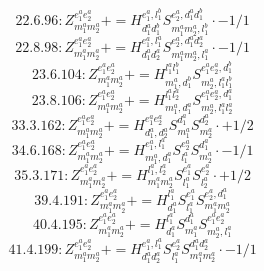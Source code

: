 \documentclass[letterpaper,10pt,fleqn,leqno,onecolumn]{article}
\begin{document}
\begin{equation} \;\;\;\;\;\;  22.6.96: Z^{e_{1}^{a}e_{2}^{a}}_{m_{1}^{a}m_{2}^{a}}+=H^{e_{1}^{a},l_{1}^{b}}_{d_{1}^{a}d_{1}^{b}}S^{e_{2}^{a},d_{1}^{a}d_{1}^{b}}_{m_{1}^{a}m_{2}^{a},l_{1}^{b}}\cdot -1/1 \end{equation}
\begin{equation} \;\;\;\;\;\;  22.8.98: Z^{e_{1}^{a}e_{2}^{a}}_{m_{1}^{a}m_{2}^{a}}+=H^{e_{1}^{a},l_{1}^{a}}_{d_{1}^{a}d_{2}^{a}}S^{e_{2}^{a},d_{1}^{a}d_{2}^{a}}_{m_{1}^{a}m_{2}^{a},l_{1}^{a}}\cdot -1/1 \end{equation}
\begin{equation} \;\;\;\;\;\;  23.6.104: Z^{e_{1}^{a}e_{2}^{a}}_{m_{1}^{a}m_{2}^{a}}+=H^{l_{1}^{a}l_{1}^{b}}_{m_{1}^{a},d_{1}^{b}}S^{e_{1}^{a}e_{2}^{a},d_{1}^{b}}_{m_{2}^{a},l_{1}^{a}l_{1}^{b}} \end{equation}
\begin{equation} \;\;\;\;\;\;  23.8.106: Z^{e_{1}^{a}e_{2}^{a}}_{m_{1}^{a}m_{2}^{a}}+=H^{l_{1}^{a}l_{2}^{a}}_{m_{1}^{a},d_{1}^{a}}S^{e_{1}^{a}e_{2}^{a},d_{1}^{a}}_{m_{2}^{a},l_{1}^{a}l_{2}^{a}} \end{equation}
\begin{equation} \;\;\;\;\;\;  33.3.162: Z^{e_{1}^{a}e_{2}^{a}}_{m_{1}^{a}m_{2}^{a}}+=H^{e_{1}^{a}e_{2}^{a}}_{d_{1}^{a},d_{2}^{a}}S^{d_{1}^{a}}_{m_{1}^{a}}S^{d_{2}^{a}}_{m_{2}^{a}}\cdot +1/2 \end{equation}
\begin{equation} \;\;\;\;\;\;  34.6.168: Z^{e_{1}^{a}e_{2}^{a}}_{m_{1}^{a}m_{2}^{a}}+=H^{e_{1}^{a},l_{1}^{a}}_{m_{1}^{a},d_{1}^{a}}S^{e_{2}^{a}}_{l_{1}^{a}}S^{d_{1}^{a}}_{m_{2}^{a}}\cdot -1/1 \end{equation}
\begin{equation} \;\;\;\;\;\;  35.3.171: Z^{e_{1}^{a}e_{2}^{a}}_{m_{1}^{a}m_{2}^{a}}+=H^{l_{1}^{a},l_{2}^{a}}_{m_{1}^{a}m_{2}^{a}}S^{e_{1}^{a}}_{l_{1}^{a}}S^{e_{2}^{a}}_{l_{2}^{a}}\cdot +1/2 \end{equation}
\begin{equation} \;\;\;\;\;\;  39.4.191: Z^{e_{1}^{a}e_{2}^{a}}_{m_{1}^{a}m_{2}^{a}}+=H^{l_{1}^{a}}_{d_{1}^{a}}S^{e_{1}^{a}}_{l_{1}^{a}}S^{e_{2}^{a},d_{1}^{a}}_{m_{1}^{a}m_{2}^{a}} \end{equation}
\begin{equation} \;\;\;\;\;\;  40.4.195: Z^{e_{1}^{a}e_{2}^{a}}_{m_{1}^{a}m_{2}^{a}}+=H^{l_{1}^{a}}_{d_{1}^{a}}S^{d_{1}^{a}}_{m_{1}^{a}}S^{e_{1}^{a}e_{2}^{a}}_{m_{2}^{a},l_{1}^{a}} \end{equation}
\begin{equation} \;\;\;\;\;\;  41.4.199: Z^{e_{1}^{a}e_{2}^{a}}_{m_{1}^{a}m_{2}^{a}}+=H^{e_{1}^{a},l_{1}^{a}}_{d_{1}^{a}d_{2}^{a}}S^{e_{2}^{a}}_{l_{1}^{a}}S^{d_{1}^{a}d_{2}^{a}}_{m_{1}^{a}m_{2}^{a}}\cdot -1/1 \end{equation}
\end{document}
